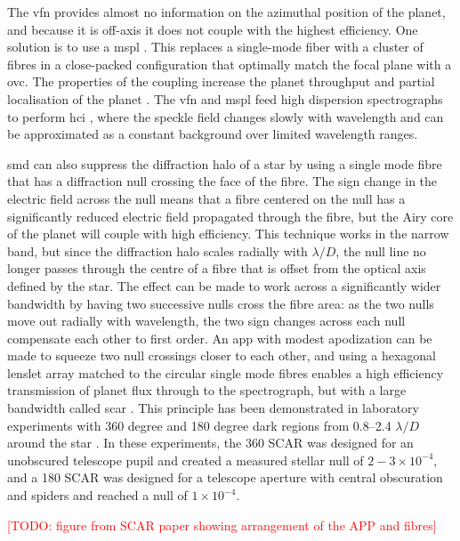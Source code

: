 \documentclass[letterpaper]{ar-1col}
\newcommand{\ld}{$\lambda/D$}
\newcommand{\todo}[1]{\textcolor{red}{[TODO: #1]}}
\begin{document}
The \ac{vfn} provides almost no information on the azimuthal position of the planet, and because it is off-axis it does not couple with the highest efficiency.
%
One solution is to use a \acl{mspl} \citep[\acs{mspl}; ][]{LeonSaval13}.
%
This replaces a single-mode fiber with a cluster of fibres in a close-packed configuration that optimally match the focal plane with a \ac{ovc}.
%
The properties of the coupling increase the planet throughput and partial localisation of the planet \citep{Xin22}.
%
The \ac{vfn} and \ac{mspl} feed high dispersion spectrographs to perform \ac{hci} \citep[][ and this Review]{Snellen15}, where the speckle field changes slowly with wavelength and can be approximated as a constant background over limited wavelength ranges.

\ac{smd} can also suppress the diffraction halo of a star by using a single mode fibre that has a diffraction null crossing the face of the fibre.
%
The sign change in the electric field across the null means that a fibre centered on the null has a significantly reduced electric field propagated through the fibre, but the Airy core of the planet will couple with high efficiency.
%
This technique works in the narrow band, but since the diffraction halo scales radially with \ld{}, the null line no longer passes through the centre of a fibre that is offset from the optical axis defined by the star.
%
The effect can be made to work across a significantly wider bandwidth by having two successive nulls cross the fibre area: as the two nulls move out radially with wavelength, the two sign changes across each null compensate each other to first order.
%
An \ac{app} with modest apodization can be made to squeeze two null crossings closer to each other, and using a hexagonal lenslet array matched to the circular single mode fibres enables a high efficiency transmission of planet flux through to the spectrograph, but with a large bandwidth called \acl{scar} \citep[\acs{scar}; ][]{Por20a,Haffert20}.
%
This principle has been demonstrated in laboratory experiments with 360 degree and 180 degree  dark regions from 0.8–2.4 \ld{} around the star \citep{Haffert20}.
%
In these experiments, the 360 SCAR was designed for an unobscured telescope pupil and created a measured stellar null of $2-3 \times 10^{-4}$, and a 180 SCAR was designed for a telescope aperture with central obscuration and spiders and reached a null of $1\times 10^{-4}$. 

\todo{figure from SCAR paper showing arrangement of the APP and fibres}
\end{document}
